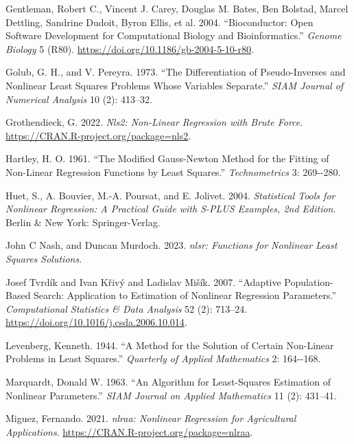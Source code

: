 \begin{CSLReferences}
Gentleman, Robert C., Vincent J. Carey, Douglas M. Bates, Ben Bolstad, Marcel Dettling, Sandrine Dudoit, Byron Ellis, et al. 2004. {``Bioconductor: Open Software Development for Computational Biology and Bioinformatics.''} \emph{{Genome Biology}} 5 (R80). \url{https://doi.org/10.1186/gb-2004-5-10-r80}.

Golub, G. H., and V. Pereyra. 1973. {``The Differentiation of Pseudo-Inverses and Nonlinear Least Squares Problems Whose Variables Separate.''} \emph{SIAM Journal of Numerical Analysis} 10 (2): 413--32.

Grothendieck, G. 2022. \emph{Nls2: Non-Linear Regression with Brute Force}. \url{https://CRAN.R-project.org/package=nls2}.

Hartley, H. O. 1961. {``The Modified Gauss-Newton Method for the Fitting of Non-Linear Regression Functions by Least Squares.''} \emph{Technometrics} 3: 269-\/-280.

Huet, S., A. Bouvier, M.-A. Poursat, and E. Jolivet. 2004. \emph{Statistical Tools for Nonlinear Regression: A Practical Guide with {S-PLUS} Examples, 2nd Edition}. Berlin \& New York: Springer-Verlag.

John C Nash, and Duncan Murdoch. 2023. \emph{{nlsr: Functions for Nonlinear Least Squares Solutions}}.

Josef Tvrdík and Ivan Křivý and Ladislav Mišík. 2007. {``Adaptive Population-Based Search: Application to Estimation of Nonlinear Regression Parameters.''} \emph{{Computational Statistics \& Data Analysis}} 52 (2): 713--24. \url{https://doi.org/10.1016/j.csda.2006.10.014}.

Levenberg, Kenneth. 1944. {``A Method for the Solution of Certain Non-Linear Problems in Least Squares.''} \emph{Quarterly of Applied Mathematics} 2: 164-\/-168.

Marquardt, Donald W. 1963. {``{An Algorithm for Least-Squares Estimation of Nonlinear Parameters}.''} \emph{SIAM Journal on Applied Mathematics} 11 (2): 431--41.

Miguez, Fernando. 2021. \emph{{nlraa: Nonlinear Regression for Agricultural Applications}}. \url{https://CRAN.R-project.org/package=nlraa}.


\end{CSLReferences}
